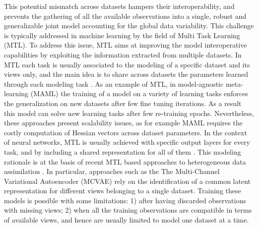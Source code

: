This potential mismatch across datasets hampers their interoperability,
and prevents the gathering of all the available observations into a single, robust and generalizable joint model accounting for the global data variability.
%
%
This challenge is typically addressed in machine learning by the field of Multi Task Learning (MTL).
To address this issue, MTL aims at improving the model interoperative capabilities by exploiting the information extracted from multiple datasets.
In MTL each task is usually associated to the modeling of a specific dataset and its views only,
and the main idea is to share across datasets the parameters learned through each modeling task \citep{Caruana1998, Dorado-Moreno2020}.
As an example of MTL, in model-agnostic meta-learning (MAML) \citep{MAML1} the training of a model on a variety of learning tasks enforces the generalization on new datasets after few fine tuning iterations.
As a result this model can solve new learning tasks after few re-training epochs.
Nevertheless, these approaches present scalability issues, as for example MAML requires the costly computation of Hessian vectors across dataset parameters.
%
In the context of neural networks, MTL is usually achieved with specific output layers for every task, and by including a shared representation for all of them \citep{Dorado-Moreno2020}.
This modeling rationale is at the basis of recent MTL based approaches to heterogeneous data assimilation \citep{Wu2018, Antelmi2019, Shi2019}.
In particular, approaches such as the The Multi-Channel Variational Autoencoder (MCVAE) \citep{Antelmi2019} rely on the identification of a common latent representation for different views belonging to a single dataset.
Training these models is possible with some limitations:
1) after having discarded observations with missing views;
2) when all the training observations are compatible in terms of available views, and hence are usually limited to model one dataset at a time.

